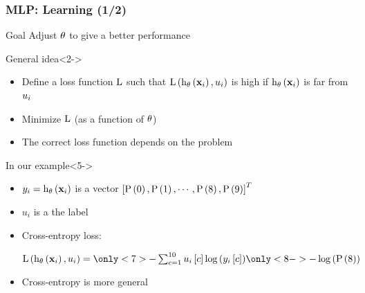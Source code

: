 \begin{frame}
  \frametitle{\acl{MLP}: Learning (1/2)}

  \begin{block}{Goal}
    Adjust $\mathbf{\theta}$ to give a better performance
  \end{block}

  \begin{block}{General idea}<2->
    \begin{itemize}
    \item<2-> Define a loss function $\mathrm{L}$ such that $\mathrm{L} \left ( {
            \mathrm{h}_{\mathbf{\theta}} \left ( {\mathbf{x}_i} \right ),
            u_i
          } \right )$ is high if $\mathrm{h}_{\mathbf{\theta}} \left ( {\mathbf{x}_i} \right )$ is far from
          $u_i$
     \item<3-> Minimize $\mathrm{L}$ (as a function of $\mathbf{\theta}$)
     \item<4-> The correct loss function depends on the problem
    \end{itemize}
  \end{block}

  \begin{block}{In our example}<5->
    \begin{itemize}
    \item $y_i = \mathrm{h}_{\mathbf{\theta}} \left ( {\mathbf{x}_i} \right )$ is a vector $\left [ {\mathrm{P} \left ( {0} \right ), \mathrm{P} \left ( {1} \right ), \cdots,
        \mathrm{P} \left ( {8} \right ), \mathrm{P} \left ( {9} \right )} \right ]^T$
    \item $u_i$ is a the label 
  \item<7-> Cross-entropy loss:
    \begin{center}
      $
        \apply{\lossFunc}{\apply{\decisionFunc_\params}{\example_i},
          \knownLabel_i} = \only<7>{- \sum_{c=1}^{10} \vectorElem{u_i}{c}
          \apply{\log}{\vectorElem{\predLabel_i}{c}}}
                           \only<8->{- \apply{\log}{\prob{8}}}
      $
    \end{center}
    \item<9-> Cross-entropy is more general
    \end{itemize}
  \end{block}
\end{frame}


